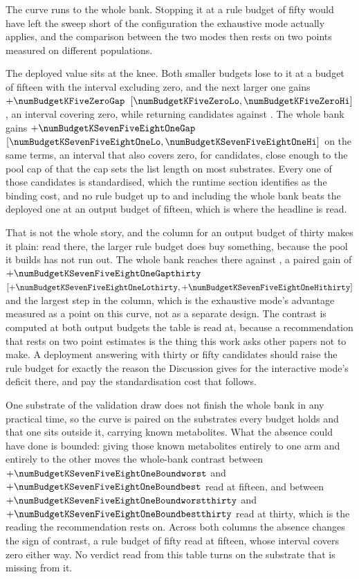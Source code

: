 \documentclass[journal=jcisd8,manuscript=suppinfo,layout=onecolumn]{achemso}
\begin{document}


The curve runs to the whole bank. Stopping it at a rule budget of fifty would have left the
sweep short of the configuration the exhaustive mode actually applies, and the comparison between
the two modes then rests on two points measured on different populations.

The deployed value sits at the knee. Both smaller budgets lose to it at a budget of fifteen with
the interval excluding zero, and the next larger one gains $+\numBudgetKFiveZeroGap$
$[\numBudgetKFiveZeroLo, \numBudgetKFiveZeroHi]$, an interval covering zero, while returning
\numBudgetKFiveZeroCandidates{} candidates against \numBudgetKThreeZeroCandidates{}. The whole
bank gains $+\numBudgetKSevenFiveEightOneGap$ $[\numBudgetKSevenFiveEightOneLo,
\numBudgetKSevenFiveEightOneHi]$ on the same terms, an interval that also covers zero, for
\numBudgetKSevenFiveEightOneCandidates{} candidates, close enough to the pool cap of
\numHNineCap{} that the cap sets the list length on most substrates. Every one of those
candidates is standardised, which the runtime section identifies as the binding cost, and no rule
budget up to and including the whole bank beats the deployed one at an output budget of fifteen,
which is where the headline is read.

That is not the whole story, and the column for an output budget of thirty makes it plain: read
there, the larger rule budget does buy something, because the pool it builds has not run out. The
whole bank reaches \numBudgetKSevenFiveEightOneRecallthirty{} there against
\numBudgetKThreeZeroRecallthirty{}, a paired gain of $+\numBudgetKSevenFiveEightOneGapthirty$
$[+\numBudgetKSevenFiveEightOneLothirty, +\numBudgetKSevenFiveEightOneHithirty]$ and the largest
step in the column, which is the exhaustive mode's advantage measured as a point on this curve,
not as a separate design. The contrast is computed at both output budgets the table is
read at, because a recommendation that rests on two point estimates is the thing this work asks
other papers not to make. A deployment
answering with thirty or fifty candidates should raise the rule budget for exactly the reason the
Discussion gives for the interactive mode's deficit there, and pay the standardisation cost that
follows.

One substrate of the validation draw does not finish the whole bank in any practical time,
so the curve is paired on the \numBudgetSubstrates{} substrates every budget holds and that one
sits outside it, carrying \numBudgetExcludedrefsWord{} known metabolites. What the absence could have
done is bounded: giving those known metabolites entirely to one arm and entirely to
the other moves the whole-bank contrast between $+\numBudgetKSevenFiveEightOneBoundworst$ and
$+\numBudgetKSevenFiveEightOneBoundbest$ read at fifteen, and between
$+\numBudgetKSevenFiveEightOneBoundworstthirty$ and $+\numBudgetKSevenFiveEightOneBoundbestthirty$
read at thirty, which is the reading the recommendation rests on. Across both columns the absence
changes the sign of \numBudgetFragileWord{} contrast, a rule budget of fifty read at fifteen,
whose interval covers zero either way. No verdict read from this table turns on the substrate
that is missing from it.
\end{document}
